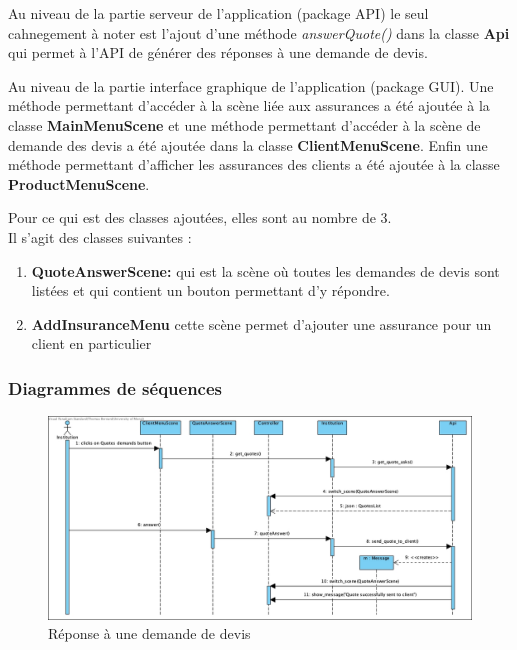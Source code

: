 \documentclass[../rapport.tex]{subfiles}
\begin{document}
		\bigskip

		Au niveau de la partie serveur de l'application (package API) le seul cahnegement à noter
		est l'ajout d'une méthode \textit{answerQuote()} dans la classe \textbf{Api} qui permet
		à l'API de générer des réponses à une demande de devis.

		\bigskip

		Au niveau de la partie interface graphique de l'application (package GUI). Une méthode 
		permettant d'accéder à la scène liée aux assurances a été ajoutée à la classe 
		\textbf{MainMenuScene} et une méthode permettant d'accéder à la scène de demande des devis
		a été ajoutée dans la classe \textbf{ClientMenuScene}. Enfin une méthode permettant 
		d'afficher les assurances des clients a été ajoutée à la classe \textbf{ProductMenuScene}.

		\medskip

		Pour ce qui est des classes ajoutées, elles sont au nombre de 3.\\
		Il s'agit des classes suivantes :
		\begin{enumerate}
				\item \textbf{QuoteAnswerScene:} qui est la scène où toutes les demandes de devis
						sont listées et qui contient un bouton permettant d'y répondre.
				\item \textbf{AddInsuranceMenu} cette scène permet d'ajouter une assurance pour
						un client en particulier
		\end{enumerate} 
\newpage
		\subsubsection{Diagrammes de séquences}
				\begin{figure}[h]
						\centering\includegraphics[scale=0.3]{ressources/photos_diagrammes/extensionThomas/reponseDevis.jpg}
						\caption{Réponse à une demande de devis}
				\end{figure}
\end{document}

